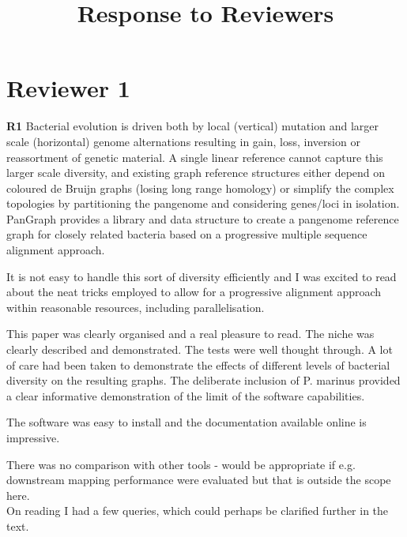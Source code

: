 \documentclass{article}
\title{Response to Reviewers}
\newcommand{\review}[1]{\textbf{#1}}
\begin{document}
\maketitle

\section*{Reviewer 1}

\review{R1} Bacterial evolution is driven both by local (vertical) mutation and larger scale (horizontal) genome alternations resulting in gain, loss, inversion or reassortment of genetic material. A single linear reference cannot capture this larger scale diversity, and existing graph reference structures either depend on coloured de Bruijn graphs (losing long range homology) or simplify the complex topologies by partitioning the pangenome and considering genes/loci in isolation. PanGraph provides a library and data structure to create a pangenome reference graph for closely related bacteria based on a progressive multiple sequence alignment approach.

It is not easy to handle this sort of diversity efficiently and I was excited to read about the neat tricks employed to allow for a progressive alignment approach within reasonable resources, including parallelisation.

This paper was clearly organised and a real pleasure to read. The niche was clearly described and demonstrated. The tests were well thought through. A lot of care had been taken to demonstrate the effects of different levels of bacterial diversity on the resulting graphs. The deliberate inclusion of P. marinus provided a clear informative demonstration of the limit of the software capabilities.

The software was easy to install and the documentation available online is impressive.

There was no comparison with other tools - would be appropriate if e.g. downstream mapping performance were evaluated but that is outside the scope here.\\

On reading I had a few queries, which could perhaps be clarified further in the text.
\end{document}
